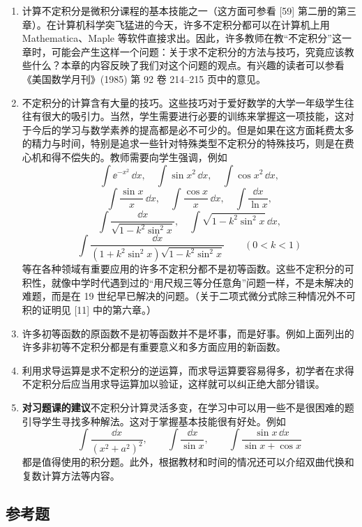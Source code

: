 \begin{enumerate}
  \item 计算不定积分是微积分课程的基本技能之一（这方面可参看 [59] 第二册的第三章）。在计算机科学突飞猛进的今天，许多不定积分都可以在计算机上用 Mathematica、Maple 等软件直接求出。因此，许多教师在教“不定积分”这一章时，可能会产生这样一个问题：关于求不定积分的方法与技巧，究竟应该教些什么？本章的内容反映了我们对这个问题的观点。有兴趣的读者可以参看《美国数学月刊》(1985) 第 92 卷 214--215 页中的意见。

  \item 不定积分的计算含有大量的技巧。这些技巧对于爱好数学的大学一年级学生往往有很大的吸引力。当然，学生需要进行必要的训练来掌握这一项技能，这对于今后的学习与数学素养的提高都是必不可少的。但是如果在这方面耗费太多的精力与时间，特别是追求一些针对特殊类型不定积分的特殊技巧，则是在费心机和得不偿失的。教师需要向学生强调，例如
  \[
    \int\ee^{-x^2}\,\dd x,
    \quad
    \int\sin x^2\,\dd x,
    \quad
    \int\cos x^2\,\dd x,
  \]
  \[
    \int\frac{\sin x}{x}\,\dd x,
    \quad
    \int\frac{\cos x}{x}\,\dd x,
    \quad
    \int\frac{\dd x}{\ln x},
  \]
  \[
    \int\frac{\dd x}{\sqrt{1-k^2\sin^2x}},
    \quad
    \int\sqrt{1-k^2\sin^2x}\,\dd x,
  \]
  \[
    \int\frac{\dd x}{(1+k^2\sin^2x)\sqrt{1-k^2\sin^2x}}
    \qquad(0<k<1)
  \]
  等在各种领域有重要应用的许多不定积分都不是初等函数。这些不定积分的可积性，就像中学时代遇到过的“用尺规三等分任意角”问题一样，不是未解决的难题，而是在 19 世纪早已解决的问题。（关于二项式微分式除三种情况外不可积的证明见 [11] 中的第六章。）

  \item 许多初等函数的原函数不是初等函数并不是坏事，而是好事。例如上面列出的许多非初等不定积分都是有重要意义和多方面应用的新函数。

  \item 利用求导运算是求不定积分的逆运算，而求导运算要容易得多，初学者在求得不定积分后应当用求导运算加以验证，这样就可以纠正绝大部分错误。

  \item \textbf{对习题课的建议}\quad 不定积分计算灵活多变，在学习中可以用一些不是很困难的题引导学生寻找多种解法。这对于掌握基本技能很有好处。例如
  \[
    \int\frac{\dd x}{(x^2+a^2)^2},
    \qquad
    \int\frac{\dd x}{\sin x},
    \qquad
    \int\frac{\sin x\,\dd x}{\sin x+\cos x}
  \]
  都是值得使用的积分题。此外，根据教材和时间的情况还可以介绍双曲代换和复数计算方法等内容。
\end{enumerate}

\subsection{参考题}

